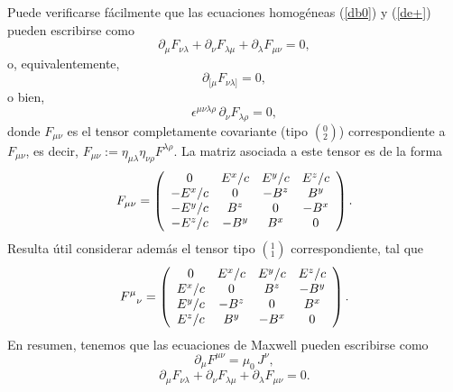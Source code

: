 Puede verificarse fácilmente que las ecuaciones homogéneas (\ref{db0}) y (\ref{de+}) pueden escribirse como
\begin{equation}
\partial_\mu F_{\nu\lambda}+\partial_\nu F_{\lambda\mu}+\partial_\lambda
F_{\mu\nu}=0,
\end{equation}
o, equivalentemente,
\begin{equation}
\partial_{[\mu}F_{\nu\lambda]}=0,
\end{equation}
o bien,
\begin{equation}
\epsilon^{\mu\nu\lambda\rho}\,\partial_{\nu}F_{\lambda\rho}=0,
\end{equation}
donde $F_{\mu\nu}$ es el tensor completamente covariante (tipo $(^0_2)$)
correspondiente a $F_{\mu\nu}$, es decir,
$F_{\mu\nu}:=\eta_{\mu\lambda}\eta_{\nu\rho}F^{\lambda\rho}$. La matriz asociada
a este tensor es de la forma
\begin{equation}
F_{\mu\nu}=\left(
\begin{array}
[c]{cccc}
0 & E^x/c & E^y/c & E^z/c\\
-E^x/c & 0 & -B^z & B^y\\
-E^y/c & B^z & 0 & -B^x\\
-E^z/c & -B^y & B^x & 0
\end{array}
\right). \label{Fdndn}
\end{equation}
Resulta útil considerar además el tensor tipo $(^1_1)$ correspondiente, tal que
\begin{equation}
F^\mu_{\ \ \nu}=\left(
\begin{array}
[c]{cccc}
0 & E^x/c & E^y/c & E^z/c\\
E^x/c & 0 & B^z & -B^y\\
E^y/c & -B^z & 0 & B^x\\
E^z/c & B^y & -B^x & 0
\end{array}
\right). \label{Fupdn}
\end{equation}
En resumen, tenemos que las ecuaciones de Maxwell pueden escribirse como
\begin{equation}
\boxed{\partial_\mu  F^{\mu \nu} = \mu_0\, J^\nu,} \label{emihF}
\end{equation}
\begin{equation}
\boxed{\partial_\mu F_{\nu\lambda}+\partial_\nu F_{\lambda\mu}+\partial_\lambda
F_{\mu\nu}=0.} \label{homcov}
\end{equation}

